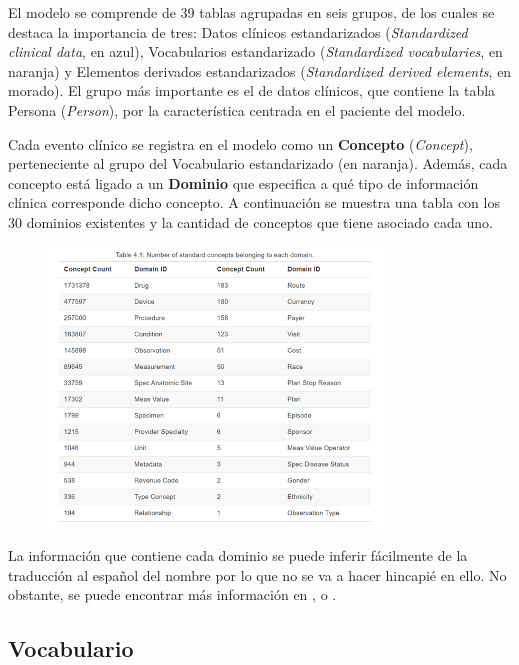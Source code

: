 El modelo se comprende de 39 tablas agrupadas en seis grupos, de los cuales se destaca la importancia de tres: Datos clínicos estandarizados (\textit{Standardized clinical data}, en azul), Vocabularios estandarizado (\textit{Standardized vocabularies}, en naranja) y Elementos derivados estandarizados (\textit{Standardized derived elements}, en morado). El grupo más importante es el de datos clínicos, que contiene la tabla Persona (\textit{Person}), por la característica centrada en el paciente del modelo.

Cada evento clínico se registra en el modelo como un \textbf{Concepto} (\textit{Concept}), perteneciente al grupo del Vocabulario estandarizado (en naranja). Además, cada concepto está ligado a un \textbf{Dominio} que especifica a qué tipo de información clínica corresponde dicho concepto. A continuación se muestra una tabla con los 30 dominios existentes y la cantidad de conceptos que tiene asociado cada uno.

\begin{figure}[H]
    \centering
    \includegraphics[width=0.80\textwidth]{figures/cdm_domains.png}
    \label{fig:cdm_domains}
\end{figure}

La información que contiene cada dominio se puede inferir fácilmente de la traducción al español del nombre por lo que no se va a hacer hincapié en ello. No obstante, se puede encontrar más información en \parencite{OHDSIbook}, \parencite{gitPagesCMD} o \parencite{CDMinteractive}.

\subsection{Vocabulario}\label{subsec:07vocab}

